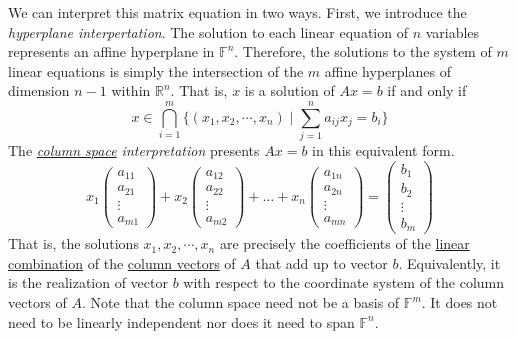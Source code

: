   We can interpret this matrix equation in two ways. First, we introduce the \textit{hyperplane interpertation}. The solution to each linear equation of $n$ variables represents an affine hyperplane in $\mathbb{F}^n$. Therefore, the solutions to the system of $m$ linear equations is simply the intersection of the $m$ affine hyperplanes of dimension $n-1$ within $\mathbb{R}^n$. That is, $x$ is a solution of $A x = b$ if and only if  
  \begin{equation}
    x \in \bigcap_{i = 1}^m \Big\{ (x_1, x_2, \cdots, x_n) \; | \; \sum_{j = 1}^n a_{i j} x_j = b_i \Big\}
  \end{equation}
  The \textit{\hyperref[def:column-space]{column space} interpretation} presents $A x = b$ in this equivalent form. 
  \begin{equation}
    x_1 \begin{pmatrix}
    a_{1 1} \\ a_{2 1} \\ \vdots \\ a_{m 1}
    \end{pmatrix} + x_2 \begin{pmatrix}
    a_{1 2} \\ a_{2 2} \\ \vdots \\ a_{m 2}
    \end{pmatrix} + \ldots + x_n \begin{pmatrix}
    a_{1 n} \\ a_{2 n} \\ \vdots \\ a_{m n}
    \end{pmatrix} = \begin{pmatrix}
    b_1 \\ b_2 \\ \vdots \\ b_m
    \end{pmatrix}
  \end{equation}
  That is, the solutions $x_1, x_2, \cdots, x_n$ are precisely the coefficients of the \hyperref[def:linear-combination]{linear combination} of the \hyperref[def:column-vector]{column vectors} of $A$ that add up to vector $b$. Equivalently, it is the realization of vector $b$ with respect to the coordinate system of the column vectors of $A$. Note that the column space need not be a basis of $\mathbb{F}^m$. It does not need to be linearly independent nor does it need to span $\mathbb{F}^n$. 

